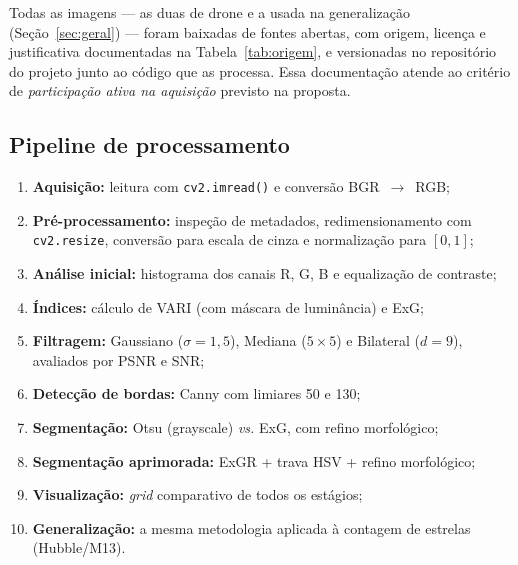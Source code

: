\documentclass[12pt,a4paper]{article}
\begin{document}
Todas as imagens --- as duas de drone e a usada na generalização (Seção~\ref{sec:geral})
--- foram baixadas de fontes abertas, com origem, licença e justificativa documentadas na
Tabela~\ref{tab:origem}, e versionadas no repositório do projeto junto ao código que as processa.
Essa documentação atende ao critério de \emph{participação ativa na aquisição} previsto na
proposta.

\begin{table}[H]
\centering
\caption{Documentação da origem das imagens.}
\label{tab:origem}
\end{table}

\subsection{Pipeline de processamento}
\begin{enumerate}
  \item \textbf{Aquisição:} leitura com \texttt{cv2.imread()} e conversão BGR~$\rightarrow$~RGB;
  \item \textbf{Pré-processamento:} inspeção de metadados, redimensionamento com
        \texttt{cv2.resize}, conversão para escala de cinza e normalização para $[0,1]$;
  \item \textbf{Análise inicial:} histograma dos canais R, G, B e equalização de contraste;
  \item \textbf{Índices:} cálculo de VARI (com máscara de luminância) e ExG;
  \item \textbf{Filtragem:} Gaussiano ($\sigma = 1{,}5$), Mediana ($5\times5$) e Bilateral
        ($d = 9$), avaliados por PSNR e SNR;
  \item \textbf{Detecção de bordas:} Canny com limiares 50 e 130;
  \item \textbf{Segmentação:} Otsu (grayscale) \emph{vs.} ExG, com refino morfológico;
  \item \textbf{Segmentação aprimorada:} ExGR + trava HSV + refino morfológico;
  \item \textbf{Visualização:} \emph{grid} comparativo de todos os estágios;
  \item \textbf{Generalização:} a mesma metodologia aplicada à contagem de estrelas (Hubble/M13).
\end{enumerate}
\end{document}
